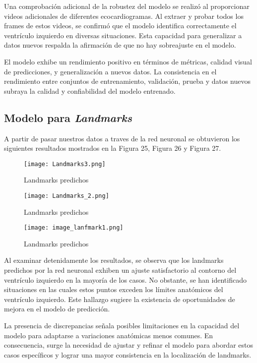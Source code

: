 \documentclass[runningheads]{llncs}
\begin{document}
Una comprobación adicional de la robustez del modelo se realizó al proporcionar videos adicionales de diferentes ecocardiogramas. Al extraer y probar todos los frames de estos videos, se confirmó que el modelo identifica correctamente el ventrículo izquierdo en diversas situaciones. Esta capacidad para generalizar a datos nuevos respalda la afirmación de que no hay sobreajuste en el modelo.

El modelo exhibe un rendimiento positivo en términos de métricas, calidad visual de predicciones, y generalización a nuevos datos. La consistencia en el rendimiento entre conjuntos de entrenamiento, validación, prueba y datos nuevos subraya la calidad y confiabilidad del modelo entrenado.



\subsection{Modelo para \textit{Landmarks}}

A partir de pasar nuestros datos a traves de la red neuronal se obtuvieron los siguientes resultados mostrados en la Figura 25, Figura 26 y Figura 27.
\begin{figure} [H]
    \centering
    \texttt{[image: Landmarks3.png]}
    \caption{Landmarks predichos}
    \label{fig:enter-label}
\end{figure}
\begin{figure} [H]
    \centering
    \texttt{[image: Landmarks\_2.png]}
    \caption{Landmarks predichos}
    \label{fig:enter-label}
\end{figure}
\begin{figure} [H]
    \centering
    \texttt{[image: image\_lanfmark1.png]}
    \caption{Landmarks predichos}
    \label{fig:enter-label}
\end{figure}


Al examinar detenidamente los resultados, se observa que los landmarks predichos por la red neuronal exhiben un ajuste satisfactorio al contorno del ventrículo izquierdo en la mayoría de los casos. No obstante, se han identificado situaciones en las cuales estos puntos exceden los límites anatómicos del ventrículo izquierdo. Este hallazgo sugiere la existencia de oportunidades de mejora en el modelo de predicción.

La presencia de discrepancias señala posibles limitaciones en la capacidad del modelo para adaptarse a variaciones anatómicas menos comunes. En consecuencia, surge la necesidad de ajustar y refinar el modelo para abordar estos casos específicos y lograr una mayor consistencia en la localización de landmarks.
\end{document}
